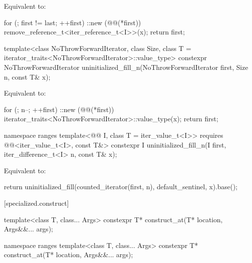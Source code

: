 \begin{itemdescr}
\pnum
\effects
Equivalent to:
\begin{codeblock}
for (; first != last; ++first)
  ::new (@@(*first)) remove_reference_t<iter_reference_t<I>>(x);
return first;
\end{codeblock}
\end{itemdescr}

%
\begin{itemdecl}
template<class NoThrowForwardIterator, class Size,
         class T = iterator_traits<NoThrowForwardIterator>::value_type>
  constexpr NoThrowForwardIterator
    uninitialized_fill_n(NoThrowForwardIterator first, Size n, const T& x);
\end{itemdecl}

\begin{itemdescr}
\pnum
\effects
Equivalent to:
\begin{codeblock}
for (; n--; ++first)
  ::new (@@(*first)) iterator_traits<NoThrowForwardIterator>::value_type(x);
return first;
\end{codeblock}
\end{itemdescr}

%
\begin{itemdecl}
namespace ranges {
  template<@@ I, class T = iter_value_t<I>>
    requires @@<iter_value_t<I>, const T&>
    constexpr I uninitialized_fill_n(I first, iter_difference_t<I> n, const T& x);
}
\end{itemdecl}

\begin{itemdescr}
\pnum
\effects
Equivalent to:
\begin{codeblock}
return uninitialized_fill(counted_iterator(first, n), default_sentinel, x).base();
\end{codeblock}
\end{itemdescr}

[specialized.construct]{}

\begin{itemdecl}
template<class T, class... Args>
  constexpr T* construct_at(T* location, Args&&... args);

namespace ranges {
  template<class T, class... Args>
    constexpr T* construct_at(T* location, Args&&... args);
}
\end{itemdecl}


